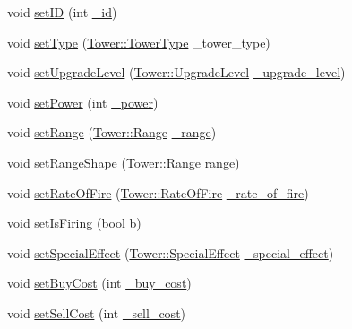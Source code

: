 \begin{DoxyCompactItemize}
\item 
void \hyperlink{class_tower_a2ad5e52d8c8e3c5783b1c3499f19ceca}{set\+I\+D} (int \hyperlink{class_tower_a02ec2f8d1c4dea2f7fc002d8626c8b28}{\+\_\+id})
\item 
void \hyperlink{class_tower_a47ee9428118e95e689950ad605f90cb3}{set\+Type} (\hyperlink{class_tower_a110a21c18d4ec095c6234bd17f004b3e}{Tower\+::\+Tower\+Type} \+\_\+tower\+\_\+type)
\item 
void \hyperlink{class_tower_ac31643b1a10e1821d90583dc9ff03943}{set\+Upgrade\+Level} (\hyperlink{class_tower_a23889cd9ee2fbae0420c97105fd6ebc8}{Tower\+::\+Upgrade\+Level} \hyperlink{class_tower_a0172731487da6a0480901e031e2aecbe}{\+\_\+upgrade\+\_\+level})
\item 
void \hyperlink{class_tower_a89f3c815849be59057c2bcdeb1bb097f}{set\+Power} (int \hyperlink{class_tower_af9e223c165f5632944868df3dfc70bee}{\+\_\+power})
\item 
void \hyperlink{class_tower_a3490999581d98e1e99e4cfaf328e1155}{set\+Range} (\hyperlink{class_tower_a52bcc3e7f85c01b3105e919717503169}{Tower\+::\+Range} \hyperlink{class_tower_a71ece6661af3529aaa2da1bf30a53fd5}{\+\_\+range})
\item 
void \hyperlink{class_tower_a1770164e2620e27413a05cf6adad1287}{set\+Range\+Shape} (\hyperlink{class_tower_a52bcc3e7f85c01b3105e919717503169}{Tower\+::\+Range} range)
\item 
void \hyperlink{class_tower_a954b831038f6fe86e40d0dcd398bd239}{set\+Rate\+Of\+Fire} (\hyperlink{class_tower_ae82ae8201f8921eb64878d2c9ecb5bb2}{Tower\+::\+Rate\+Of\+Fire} \hyperlink{class_tower_a746898a9884a60cf09c5b4d0f1fdac2a}{\+\_\+rate\+\_\+of\+\_\+fire})
\item 
void \hyperlink{class_tower_af1ca7002ff17d468f7b9b3b5e4f99348}{set\+Is\+Firing} (bool b)
\item 
void \hyperlink{class_tower_ac2b7becdd52924a8787cf7de2a62fff5}{set\+Special\+Effect} (\hyperlink{class_tower_a355ab1cbcfd8c4d037ccf8937f784445}{Tower\+::\+Special\+Effect} \hyperlink{class_tower_ad6a84071c2e7f48386443c469961116c}{\+\_\+special\+\_\+effect})
\item 
void \hyperlink{class_tower_ad103dd810daf5865560a9a8df0e9a783}{set\+Buy\+Cost} (int \hyperlink{class_tower_a102680a58c45f98a79609ce8961a7bed}{\+\_\+buy\+\_\+cost})
\item 
void \hyperlink{class_tower_ade5f41558a0240b5596a017a23334336}{set\+Sell\+Cost} (int \hyperlink{class_tower_a7f50414500ec524ccc6ffb7069328d1e}{\+\_\+sell\+\_\+cost})
\item 

\end{DoxyCompactItemize}

